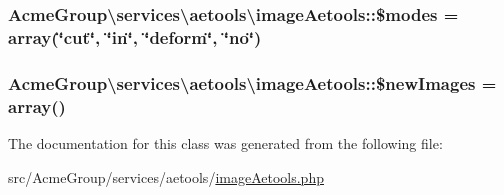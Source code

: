 \hypertarget{class_acme_group_1_1services_1_1aetools_1_1image_aetools_a1e89d8a2da5b8212e683826956a15c72}{
\subsubsection[{\$modes}]{\setlength{\rightskip}{0pt plus 5cm}Acme\+Group\textbackslash{}services\textbackslash{}aetools\textbackslash{}image\+Aetools\+::\$modes = array(\char`\"{}cut\char`\"{}, \char`\"{}in\char`\"{}, \char`\"{}deform\char`\"{}, \char`\"{}no\char`\"{})\hspace{0.3cm}{\ttfamily [protected]}}}\label{class_acme_group_1_1services_1_1aetools_1_1image_aetools_a1e89d8a2da5b8212e683826956a15c72}
\hypertarget{class_acme_group_1_1services_1_1aetools_1_1image_aetools_a92584c7cb5b0af46a6c0421f52982986}{
\subsubsection[{\$new\+Images}]{\setlength{\rightskip}{0pt plus 5cm}Acme\+Group\textbackslash{}services\textbackslash{}aetools\textbackslash{}image\+Aetools\+::\$new\+Images = array()\hspace{0.3cm}{\ttfamily [protected]}}}\label{class_acme_group_1_1services_1_1aetools_1_1image_aetools_a92584c7cb5b0af46a6c0421f52982986}


The documentation for this class was generated from the following file\+:\begin{DoxyCompactItemize}
\item 
src/\+Acme\+Group/services/aetools/\hyperlink{image_aetools_8php}{image\+Aetools.\+php}\end{DoxyCompactItemize}
